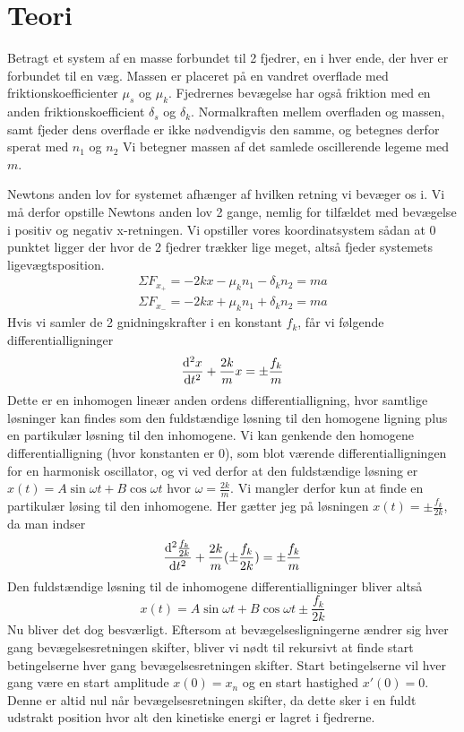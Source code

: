\chapter{Teori}
Betragt et system af en masse forbundet til 2 fjedrer, en i hver ende, der hver er forbundet til en væg. 
Massen er placeret på en vandret overflade med friktionskoefficienter $\mu_s$ og $\mu_k$. 
Fjedrernes bevægelse har også friktion med en anden friktionskoefficient $\delta_s$ og $\delta_k$. 
Normalkraften mellem overfladen og massen, samt fjeder dens overflade er ikke nødvendigvis den samme, og betegnes derfor sperat med $n_1$ og $n_2$
Vi betegner massen af det samlede oscillerende legeme med $m$. 

Newtons anden lov for systemet afhænger af hvilken retning vi bevæger os i. 
Vi må derfor opstille Newtons anden lov 2 gange, nemlig for tilfældet med bevægelse i positiv og negativ x-retningen. 
Vi opstiller vores koordinatsystem sådan at 0 punktet ligger der hvor de 2 fjedrer trækker lige meget, altså fjeder systemets ligevægtsposition.
\begin{align*}
    \Sigma F_{x_+} = -2kx - \mu_k n_1 - \delta_k n_2 = ma\\
    \Sigma F_{x_-} = -2kx + \mu_k n_1 + \delta_k n_2 = ma
\end{align*}
Hvis vi samler de 2 gnidningskrafter i en konstant $f_k$, får vi følgende differentialligninger
\begin{equation}
    \odv[order=2]{x}{t} + \frac{2k}{m}x = \pm \frac{f_k}{m}
\end{equation}
Dette er en inhomogen lineær anden ordens differentialligning, hvor samtlige løsninger kan findes 
som den fuldstændige løsning til den homogene ligning plus en partikulær løsning til den inhomogene.
Vi kan genkende den homogene differentialligning (hvor konstanten er 0), som blot værende differentialligningen for en harmonisk oscillator, 
og vi ved derfor at den fuldstændige løsning er $x(t) = A\sin\omega t + B\cos\omega t$ hvor $\omega = \frac{2k}{m}$. Vi mangler derfor kun at finde en partikulær løsing til den inhomogene.
Her gætter jeg på løsningen $x(t) = \pm \frac{f_k}{2k}$, da man indser
\[
     \odv[order=2]{\frac{f_k}{2k}}{t} + \frac{2k}{m}(\pm\frac{f_k}{2k}) = \pm \frac{f_k}{m}
\]
Den fuldstændige løsning til de inhomogene differentialligninger bliver altså
\begin{equation}
    x(t) = A\sin\omega t + B\cos\omega t \pm \frac{f_k}{2k}
\end{equation}
Nu bliver det dog besværligt. Eftersom at bevægelsesligningerne ændrer sig hver gang bevægelsesretningen skifter, 
bliver vi nødt til rekursivt at finde start betingelserne hver gang bevægelsesretningen skifter.
Start betingelserne vil hver gang være en start amplitude $x(0) = x_n$ og en start hastighed $x'(0) = 0$. Denne er altid nul når bevægelsesretningen skifter, da dette sker i en fuldt udstrakt position hvor alt den kinetiske energi er lagret i fjedrerne.

